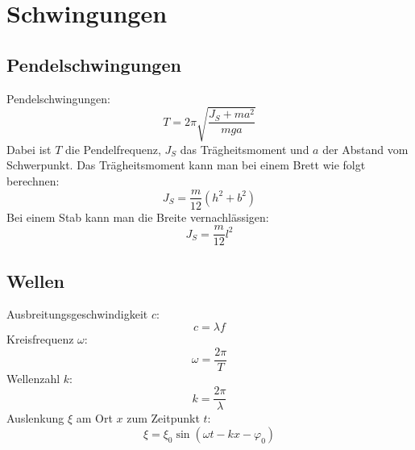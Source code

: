 \section{Schwingungen}

\subsection{Pendelschwingungen}

Pendelschwingungen:
\[
	T = 2 \pi \sqrt{\frac{J_S + ma^2}{mga}}	
\]
Dabei ist $T$ die Pendelfrequenz, $J_S$ das Trägheitsmoment und $a$ der Abstand
vom Schwerpunkt. Das Trägheitsmoment kann man bei einem Brett wie folgt
berechnen:
\[
	J_S = \frac{m}{12} \left(h^2 + b^2\right)
\]
Bei einem Stab kann man die Breite vernachlässigen:
\[
	J_S = \frac{m}{12} l^2
\]

\subsection{Wellen}



Ausbreitungsgeschwindigkeit $c$:
\[
	c = \lambda f
\]
Kreisfrequenz $\omega$:
\[
	\omega = \frac{2 \pi}{T}
\]
Wellenzahl $k$:
\[
	k = \frac{2 \pi}{\lambda}
\]
Auslenkung $\xi$ am Ort $x$ zum Zeitpunkt $t$:
\[
	\xi = \xi_0 \sin (\omega t - k x - \varphi_0)
\]
